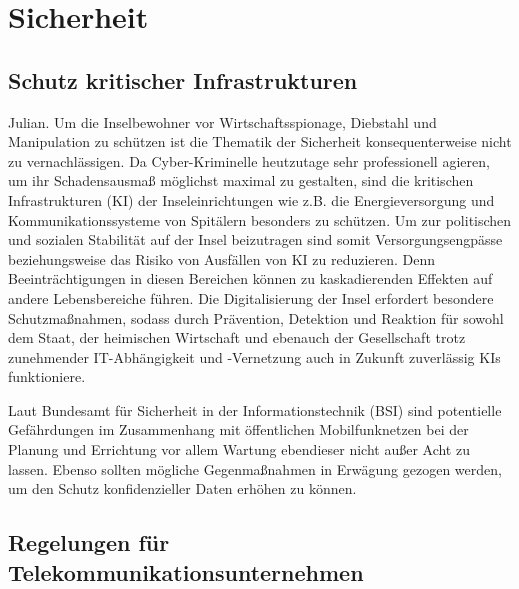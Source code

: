 
%
%
% 
% 
% 

\section{Sicherheit}
\label{sec:sicherheit}
\subsection{Schutz kritischer Infrastrukturen}

Julian.
Um die Inselbewohner vor Wirtschaftsspionage, Diebstahl und Manipulation zu schützen ist die Thematik der Sicherheit konsequenterweise nicht zu vernachlässigen. Da Cyber-Kriminelle heutzutage sehr professionell agieren, um ihr Schadensausmaß möglichst maximal zu gestalten, sind die kritischen Infrastrukturen (KI) der Inseleinrichtungen wie z.B. die Energieversorgung und Kommunikationssysteme von Spitälern besonders zu schützen. Um zur politischen und sozialen Stabilität auf der Insel beizutragen sind somit Versorgungsengpässe beziehungsweise das Risiko von Ausfällen von KI zu reduzieren. Denn Beeinträchtigungen in diesen Bereichen können zu kaskadierenden Effekten auf andere Lebensbereiche führen. Die Digitalisierung der Insel erfordert besondere Schutzmaßnahmen, sodass durch Prävention, Detektion und Reaktion für sowohl dem Staat, der heimischen Wirtschaft und ebenauch der Gesellschaft trotz zunehmender IT-Abhängigkeit und -Vernetzung auch in Zukunft zuverlässig KIs funktioniere.\cite{BSI17} 

Laut Bundesamt für Sicherheit in der Informationstechnik (BSI) sind potentielle Gefährdungen im Zusammenhang mit öffentlichen Mobilfunknetzen bei der Planung und Errichtung vor allem Wartung ebendieser nicht außer Acht zu lassen. Ebenso sollten mögliche Gegenmaßnahmen in Erwägung gezogen werden, um den Schutz konfidenzieller Daten erhöhen zu können. \cite{Ger08}

\subsection{Regelungen für Telekommunikationsunternehmen}

